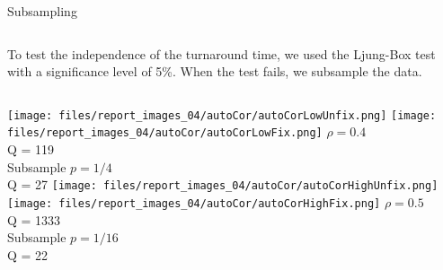 \documentclass[aspectratio=169,xcolor=dvipsnames]{beamer}
\begin{document}

\begin{frame}{Subsampling}
    \begin{columns}[c]
        To test the independence of the turnaround time, we used the Ljung-Box test with a significance level of 5\%.
        When the test fails, we subsample the data.
    \end{columns}
    \begin{columns}[c]
        \texttt{[image: files/report\_images\_04/autoCor/autoCorLowUnfix.png]}
        \texttt{[image: files/report\_images\_04/autoCor/autoCorLowFix.png]}
        $\rho=0.4$\\Q = 119\\
        \vspace{.35\textheight}
        Subsample $p=1/4$\\Q = 27
        \texttt{[image: files/report\_images\_04/autoCor/autoCorHighUnfix.png]}
        \texttt{[image: files/report\_images\_04/autoCor/autoCorHighFix.png]}
        $\rho=0.5$\\Q = 1333\\
        \vspace{.35\textheight}
        Subsample $p=1/16$\\Q = 22
    \end{columns}
\end{frame}


\end{document}
